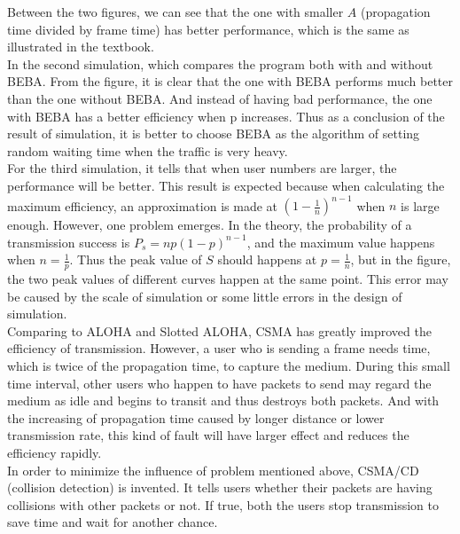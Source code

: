 \documentclass[11pt,a4paper]{report}
\begin{document}
Between the two figures, we can see that the one with smaller \(A\) (propagation time divided by frame time) has better performance, which is the same as illustrated in the textbook. \\

In the second simulation, which compares the program both with and without BEBA. From the figure, it is clear that the one with BEBA performs much better than the one without BEBA. And instead of having bad performance, the one with BEBA has a better efficiency when p increases. Thus as a conclusion of the result of simulation, it is better to choose BEBA as the algorithm of setting random waiting time when the traffic is very heavy. \\

For the third simulation, it tells that when user numbers are larger, the performance will be better. This result is expected because when calculating the maximum efficiency, an approximation is made at \((1-\frac{1}{n})^{n-1}\) when \(n\) is large enough. However, one problem emerges. In the theory, the probability of a transmission success is \(P_s = np(1-p)^{n-1}\), and the maximum value happens when \(n = \frac{1}{p}\). Thus the peak value of \(S\) should happens at \(p = \frac{1}{n}\), but in the figure, the two peak values of different curves happen at the same point. This error may be caused by the scale of simulation or some little errors in the design of simulation. \\

Comparing to ALOHA and Slotted ALOHA, CSMA has greatly improved the efficiency of transmission. However, a user who is sending a frame needs time, which is twice of the propagation time, to capture the medium. During this small time interval, other users who happen to have packets to send may regard the medium as idle and begins to transit and thus destroys both packets. And with the increasing of propagation time caused by longer distance or lower transmission rate, this kind of fault will have larger effect and reduces the efficiency rapidly. \\

In order to minimize the influence of problem mentioned above, CSMA/CD (collision detection) is invented. It tells users whether their packets are having collisions with other packets or not. If true, both the users stop transmission to save time and wait for another chance. \\
\end{document}

